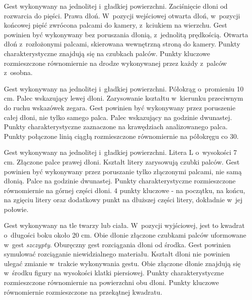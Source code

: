          {Gest wykonywany na jednolitej i~gładkiej powierzchni.}
         {Zaciśnięcie dłoni od rozwarcia do pięści.}
         {Prawa dłoń.}
         {W~pozycji wejściowej otwarta dłoń, w~pozycji końcowej pięść zwrócona palcami do kamery, z~kciukiem na wierzchu.}
         {Gest powinien być wykonywany bez poruszania dłonią, z~jednolitą prędkością.}
         {Otwarta dłoń z~rozłożonymi palcami, skierowana wewnętrzną stroną do kamery.}
         {Punkty charakterystyczne znajdują się na czubkach palców.}
         {Punkty kluczowe rozmieszczone równomiernie na drodze wykonywanej przez każdy z~palców z~osobna.}

    \newpage
         {Gest wykonywany na jednolitej i~gładkiej powierzchni.}
         {Półokrąg o~promieniu 10 cm.}
         {Palec wskazujący lewej dłoni.}
         {Zarysowanie kształtu w~kierunku przeciwnym do ruchu wskazówek zegara.}
         {Gest powinien być wykonywany przez poruszenie całej dłoni, nie tylko samego palca.}
         {Palec wskazujący na godzinie dwunastej.}
         {Punkty charakterystyczne zaznaczone na krawędziach analizowanego palca.}
         {Punkty połączone linią ciągłą rozmieszczone równomiernie na półokręgu co 30\degree.}

         {Gest wykonywany na jednolitej i~gładkiej powierzchni.}
         {Litera L o~wysokości 7 cm.}
         {Złączone palce prawej dłoni.}
         {Kształt litery zarysowują czubki palców.}
         {Gest powinien być wykonywany przez poruszanie tylko złączonymi palcami, nie samą dłonią.}
         {Palce na godzinie dwunastej.}
         {Punkty charakterystyczne rozmieszczone równomiernie na górnej części dłoni.}
         {4 punkty kluczowe - na początku, na końcu, na zgięciu litery oraz dodatkowy punkt na dłuższej części litery, dokładnie w~jej połowie.}

    \newpage
         {Gest wykonywany na tle twarzy lub ciała.}
         {W~pozycji wyjściowej, jest to kwadrat o~długości boku około 20 cm.}
         {Obie dłonie złączone czubkami palców uformowane w~gest \textit{szczypty}.}
         {Oburęczny gest rozciągania dłoni od środka.}
         {Gest powinien symulować rozciąganie niewidzialnego materiału. Kształt dłoni nie powinien ulegać zmianie w~trakcie wykonywania gestu.}
         {Obie złączone dłonie znajdują się w~środku figury na wysokości klatki piersiowej.}
         {Punkty charakterystyczne rozmieszczone równomiernie na powierzchni obu dłoni.}
         {Punkty kluczowe równomiernie rozmieszczone na przekątnej kwadratu.}


